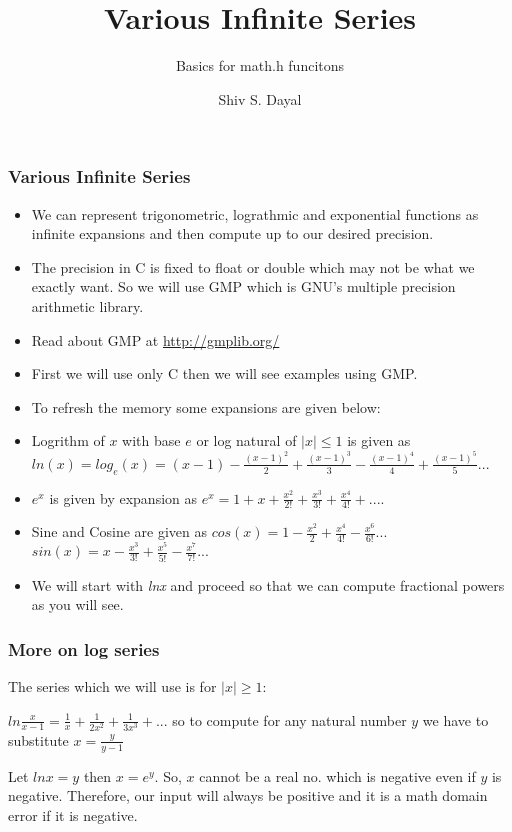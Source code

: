 \documentclass[aspectratio=1610]{beamer}
\begin{document}
\begin{frame}
\title{Various Infinite Series}
\subtitle{Basics for math.h funcitons}
\author{Shiv S. Dayal}
\titlepage
\end{frame}

\begin{frame}
\frametitle{Various Infinite Series}
\begin{itemize}
\item We can represent trigonometric, lograthmic and exponential functions as
infinite expansions and then compute up to our desired precision.
\item The precision in C is fixed to float or double which may not be what we 
exactly want. So we will use GMP which is GNU's multiple precision arithmetic
library.
\item Read about GMP at \url{http://gmplib.org/}
\item First we will use only C then we will see examples using GMP.
\item To refresh the memory some expansions are given below:
\item Logrithm of $x$ with base $e$ or log natural of $|x|\le 1$ is given as
$ln(x)=log_e(x)=(x-1)-\frac{(x-1)^2}{2}+\frac{(x-1)^3}{3}-\frac{(x-1)^4}{4}+\frac{(x-1)^5}{5} ...$
\item $e^x$ is given by expansion as $e^x=1+x+\frac{x^2}{2!}+\frac{x^3}{3!}+
\frac{x^4}{4!}+ ....$
\item Sine and Cosine are given as $cos(x)=1-\frac{x^2}{2}+\frac{x^4}{4!}
-\frac{x^6}{6!} ...$
$sin(x)=x-\frac{x^3}{3!}+\frac{x^5}{5!}-\frac{x^7}{7!} ...$
\item We will start with \textit{lnx} and proceed so that we can compute
fractional powers as you will see.
\end{itemize}
\end{frame}

\begin{frame}
\frametitle{More on log series}
The series which we will use is for $|x|\ge 1$:

$ln\frac{x}{x-1} = \frac{1}{x} + \frac{1}{2x^2} + \frac{1}{3x^3} + ...$
so to compute for any natural number $y$ we have to substitute $x=\frac{y}{y-1}$

Let $lnx=y$ then $x=e^y.$ So, $x$ cannot be a real no. which is negative even if
$y$ is negative. Therefore, our input will always be positive and it is a
math domain error if it is negative. 
\end{frame}
\end{document}
